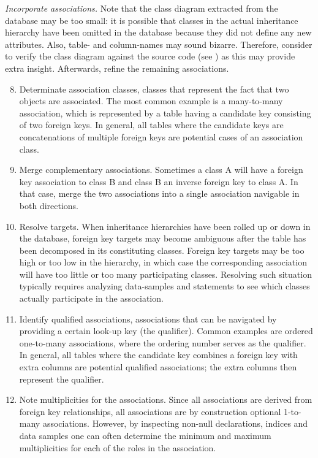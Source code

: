 \documentclass[a4paper,10pt,twoside]{book}
\begin{document}
\noindent
\emph{Incorporate associations.}
Note that the class diagram extracted from the database may be too small: it is possible 
that classes in the actual inheritance hierarchy have been omitted in the database because 
they did not define any new attributes. Also, table- and column-names may sound bizarre. 
Therefore, consider to verify the class diagram against the source code (see 
) as this may provide extra insight. 
Afterwards, refine the remaining associations.

\begin{enumerate}\setcounter{enumi}{7}
  \item Determinate association classes, \ie classes that represent the fact that two 
objects are associated. The most common example is a many-to-many association, which is 
represented by a table having a candidate key consisting of two foreign keys. In general, 
all tables where the candidate keys are concatenations of multiple foreign keys are 
potential cases of an association class.

  \item Merge complementary associations. Sometimes a class A will have a foreign key 
association to class B and class B an inverse foreign key to class A. In that case, merge 
the two associations into a single association navigable in both directions.

  \item Resolve  targets. When inheritance hierarchies have been rolled up 
or down in the database, foreign key targets may become ambiguous after the table has been 
decomposed in its constituting classes. Foreign key targets may be too high or too low in 
the hierarchy, in which case the corresponding association will have too little or too many 
participating classes. Resolving such situation typically requires analyzing data-samples 
and  statements to see which classes actually participate in the association.

  \item Identify qualified associations, \ie associations that can be navigated by 
providing a certain look-up key (the qualifier). Common examples are ordered one-to-many 
associations, where the ordering number serves as the qualifier. In general, all tables 
where the candidate key combines a foreign key with extra columns are potential qualified 
associations; the extra columns then represent the qualifier.

  \item Note multiplicities for the associations. Since all associations are derived from 
foreign key relationships, all associations are by construction optional 1-to-many 
associations. However, by inspecting non-null declarations, indices and data samples one 
can often determine the minimum and maximum multiplicities for each of the roles in the 
association.

\end{enumerate}
\end{document}
